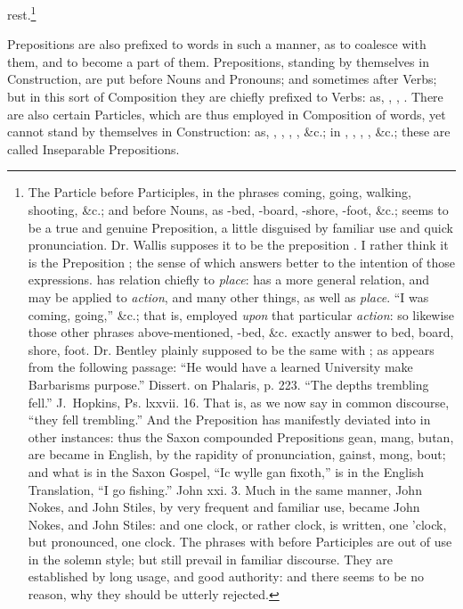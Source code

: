 rest.\footnote{The Particle  before Participles, in the phrases
   coming,  going,  walking,  shooting, \&c.;
  and before Nouns, as -bed, -board, -shore,
  -foot, \&c.; seems to be a true and genuine Preposition, a
  little disguised by familiar use and quick pronunciation. Dr. Wallis
  supposes it to be the preposition . I rather think it is the
  Preposition ; the sense of which answers better to the
  intention of those expressions.  has relation chiefly to
  \emph{place}:  has a more general relation, and may be applied
  to \emph{action}, and many other things, as well as \emph{place}. ``I
  was  coming,  going,'' \&c.; that is, employed
  \emph{upon} that particular \emph{action}: so likewise those other
  phrases above-mentioned, -bed, \&c. exactly answer to 
  bed,  board,  shore,  foot. Dr. Bentley plainly
  supposed  to be the same with ; as appears from the
  following passage: ``He would have a learned University make
  Barbarisms  purpose.'' Dissert. on Phalaris, p. 223. ``The
  depths  trembling fell.'' J.\ Hopkins, Ps. lxxvii. 16. That is,
  as we now say in common discourse, ``they fell  trembling.'' And
  the Preposition  has manifestly deviated into  in other
  instances: thus the Saxon compounded Prepositions gean,
  mang, butan, are became in English, by the rapidity of
  pronunciation, gainst, mong, bout; and what is in
  the Saxon Gospel, ``Ic wylle gan  fixoth,'' is in the English
  Translation, ``I go  fishing.'' John xxi. 3. Much in the same
  manner, John  Nokes, and John  Stiles, by very frequent
  and familiar use, became John  Nokes, and John  Stiles:
  and one  clock, or rather  clock, is written,
  one 'clock, but pronounced, one  clock. The phrases with
   before Participles are out of use in the solemn style; but
  still prevail in familiar discourse. They are established by long
  usage, and good authority: and there seems to be no reason, why they
  should be utterly rejected.}

Prepositions are also prefixed to words in such a manner, as to coalesce
with them, and to become a part of them. Prepositions, standing by
themselves in Construction, are put before Nouns and Pronouns; and
sometimes after Verbs; but in this sort of Composition they are chiefly
prefixed to Verbs: as, , , . There are also certain Particles, which are thus employed
in Composition of words, yet cannot stand by themselves in Construction:
as, , , , , \&c.; in ,
, , , \&c.; these are called
Inseparable Prepositions.
